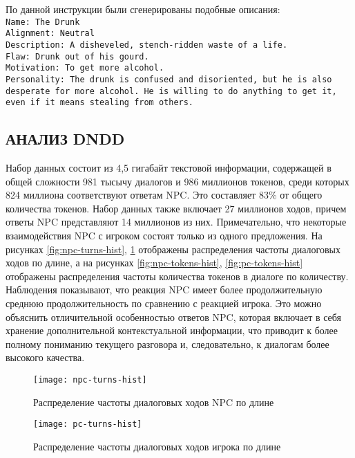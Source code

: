 По данной инструкции были сгенерированы подобные описания: \texttt{\\Name: The Drunk\\
      Alignment: Neutral\\
      Description: A disheveled, stench-ridden waste of a life.\\
      Flaw: Drunk out of his gourd.\\
      Motivation: To get more alcohol.\\
      Personality: The drunk is confused and disoriented, but he is also desperate for more alcohol. He is willing to do anything to get it, even if it means stealing from others.}

\subsection{АНАЛИЗ DNDD}
Набор данных состоит из 4,5 гигабайт текстовой информации, содержащей в общей сложности 981 тысычу диалогов и 986 миллионов токенов, среди которых 824 миллиона соответствуют ответам NPC. Это составляет 83\% от общего количества токенов. Набор данных также включает 27 миллионов ходов, причем ответы NPC представляют 14 миллионов из них. Примечательно, что некоторые взаимодействия NPC с игроком состоят только из одного предложения. На рисунках \ref{fig:npc-turns-hist}, \ref{fig:pc-turns-hist} отображены распределения частоты диалоговых ходов по длине, а на рисунках \ref{fig:npc-tokens-hist}, \ref{fig:pc-tokens-hist} отображены распределения частоты количества токенов в диалоге по количеству. Наблюдения показывают, что реакция NPC имеет более продолжительную среднюю продолжительность по сравнению с реакцией игрока. Это можно объяснить отличительной особенностью ответов NPC, которая включает в себя хранение дополнительной контекстуальной информации, что приводит к более полному пониманию текущего разговора и, следовательно, к диалогам более высокого качества.
\begin{figure}[H]
      \begin{minipage}{0.48\textwidth}
            \centering
            \texttt{[image: npc-turns-hist]}
            \caption{Распределение частоты диалоговых ходов NPC по длине}\label{fig:npc-turns-hist}
      \end{minipage}\hfill
      \begin{minipage}{0.48\textwidth}
            \centering
            \texttt{[image: pc-turns-hist]}
            \caption{Распределение частоты диалоговых ходов игрока по длине}\label{fig:pc-turns-hist}
      \end{minipage}
\end{figure}

